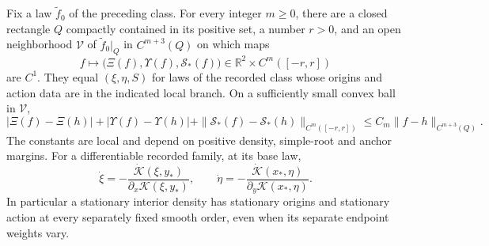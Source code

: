 \begin{proposition}
\label{prop:v51-stability}
Fix a law $\widetilde f_0$ of the preceding class.  For every integer
$m\ge0$, there are a closed rectangle $Q$ compactly contained in its
positive set, a number $r>0$, and an open neighborhood
$\mathcal V$ of $\widetilde f_0|_Q$ in $C^{m+3}(Q)$ on which maps
\[
 f\longmapsto\bigl(\Xi(f),\Upsilon(f),\mathcal S_*(f)\bigr)
       \in\mathbb R^2\times C^m([-r,r])
\]
are $C^1$.  They equal $(\xi,\eta,S)$ for laws of the recorded class
whose origins and action data are in the indicated local branch.  On a
sufficiently small convex ball in $\mathcal V$,
\begin{equation}\label{eq:v51-local-stability}
 |\Xi(f)-\Xi(h)|+|\Upsilon(f)-\Upsilon(h)|
  +\|\mathcal S_*(f)-\mathcal S_*(h)\|_{C^m([-r,r])}
       \le C_m\|f-h\|_{C^{m+3}(Q)}.
\end{equation}
The constants are local and depend on positive density, simple-root and
anchor margins.  For a differentiable recorded family, at its base law,
\begin{equation}\label{eq:v51-center-variation}
 \dot\xi=-\frac{\dot{\mathcal K}(\xi,y_*)}
                     {\partial_x\mathcal K(\xi,y_*)},\qquad
 \dot\eta=-\frac{\dot{\mathcal K}(x_*,\eta)}
                     {\partial_y\mathcal K(x_*,\eta)}.
\end{equation}
In particular a stationary interior density has stationary origins and
stationary action at every separately fixed smooth order, even when its
separate endpoint weights vary.
\end{proposition}

